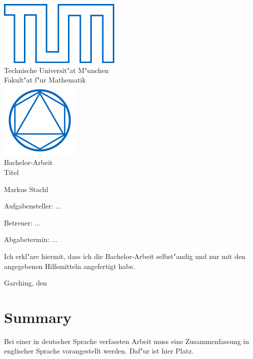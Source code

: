 \documentclass[12pt,a4paper,twoside]{article}
\begin{document}
\pagestyle{empty}
\begin{titlepage}
\begin{center}
\includegraphics{TUMblau.png}\\[3mm]
\sf
{\Large
  Technische Universit"at M"unchen\\[5mm]
  Fakult"at f"ur Mathematik\\[8mm]
}
\normalsize
\includegraphics{MA_Web.png}\\[15mm]

Bachelor-Arbeit\\[15mm]

{\Huge
  Titel
}
\bigskip

\normalsize

Markus Stachl
\end{center}
\vspace*{75mm}

Aufgabensteller: ...
\medskip

Betreuer: ...
\medskip

Abgabetermin: ...

\end{titlepage}

\vspace*{150mm}

Ich erkl"are hiermit, dass ich die Bachelor-Arbeit selbst"andig und nur mit den angegebenen
Hilfsmitteln angefertigt habe.
\bigskip

Garching, den
\newpage
\section*{Summary}
Bei einer in deutscher Sprache verfassten Arbeit muss eine Zusammenfassung in englischer Sprache vorangestellt werden.
Daf"ur ist hier Platz.
\end{document}
